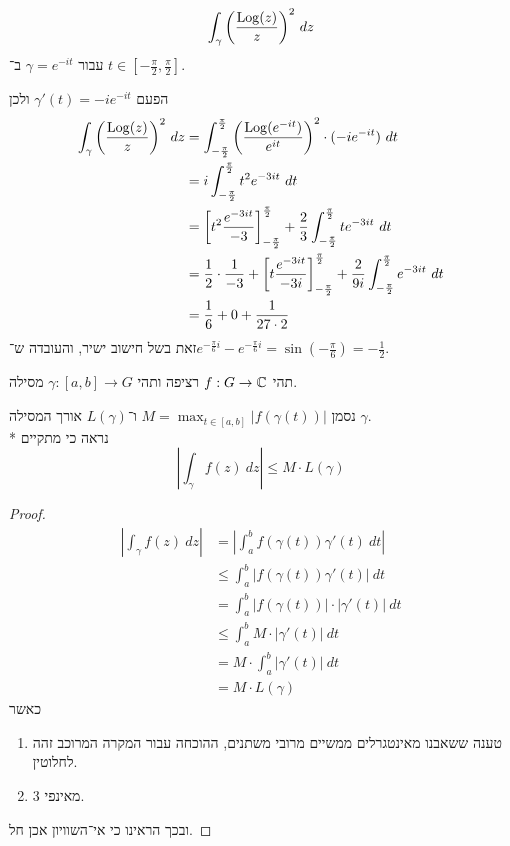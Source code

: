 \subquestion{}
\[
	\int_\gamma {\left(\frac{\operatorname{Log}(z)}{z}\right)}^2\ dz
\]
עבור $\gamma = e^{-it}$ ב־ $t \in [-\frac{\pi}{2}, \frac{\pi}{2}]$.
\begin{solution}
	הפעם $\gamma'(t) = -i e^{-it}$ ולכן
	\begin{align*}
		\int_\gamma {\left(\frac{\operatorname{Log}(z)}{z}\right)}^2\ dz
		& = \int_{-\frac{\pi}{2}}^{\frac{\pi}{2}} {\left(\frac{\operatorname{Log}(e^{-it})}{e^{it}}\right)}^2 \cdot (-i e^{-it})\ dt \\
		& = i \int_{-\frac{\pi}{2}}^{\frac{\pi}{2}} t^2 e^{-3it}\ dt \\
		& = {\left[ t^2 \frac{e^{-3it}}{-3}\right]}_{-\frac{\pi}{2}}^{\frac{\pi}{2}} + \frac{2}{3} \int_{-\frac{\pi}{2}}^{\frac{\pi}{2}} t e^{-3it}\ dt \\
		& = \frac{1}{2} \cdot \frac{1}{-3} + {\left[ t \frac{e^{-3it}}{-3i}\right]}_{-\frac{\pi}{2}}^{\frac{\pi}{2}} + \frac{2}{9i} \int_{-\frac{\pi}{2}}^{\frac{\pi}{2}} e^{-3it}\ dt \\
		& = \frac{1}{6} + 0 + \frac{1}{27 \cdot 2}
	\end{align*}
	זאת בשל חישוב ישיר, והעובדה ש־$e^{-\frac{\pi}{6}i} - e^{-\frac{\pi}{6}i} = \sin(-\frac{\pi}{6}) = -\frac{1}{2}$.
\end{solution}

\question{}
תהי $f : G \to \mathbb{C}$ רציפה ותהי $\gamma : [a, b] \to G$ מסילה.

\subquestion{}
נסמן $M = \max_{t \in [a, b]} |f(\gamma(t))|$ ו־$L(\gamma)$ אורך המסילה $\gamma$. \\*
נראה כי מתקיים
\[
	\left\lvert \int_\gamma f(z)\ dz\right\rvert \le M \cdot L(\gamma)
\]
\begin{proof}
	\begin{align*}
		\left\lvert \int_\gamma f(z)\ dz \right\rvert
		& = \left\lvert \int_a^b f(\gamma(t)) \gamma'(t)\ dt \right\rvert \\
		& \le \int_a^b \left\lvert f(\gamma(t)) \gamma'(t) \right\rvert\ dt \tag{1} \\
		& = \int_a^b \left\lvert f(\gamma(t)) \right\rvert \cdot \left\lvert \gamma'(t) \right\rvert\ dt \\
		& \le \int_a^b M \cdot \left\lvert \gamma'(t) \right\rvert\ dt \tag{2} \\
		& = M \cdot \int_a^b \left\lvert \gamma'(t) \right\rvert\ dt \\
		& = M \cdot L(\gamma)
	\end{align*}
	כאשר
	\begin{enumerate}
		\item טענה ששאבנו מאינטגרלים ממשיים מרובי משתנים, ההוכחה עבור המקרה המרוכב זהה לחלוטין.
		\item מאינפי 3.
	\end{enumerate}
	ובכך הראינו כי אי־השוויון אכן חל.
\end{proof}

